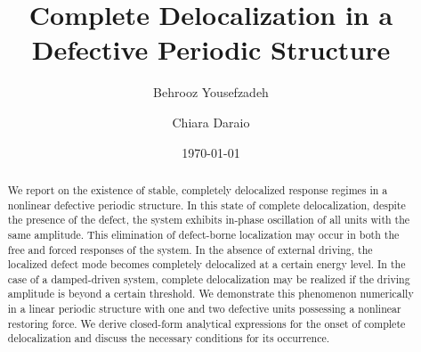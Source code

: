 \documentclass[aps,pre,twocolumn,groupedaddress]{revtex4-1}
\begin{document}

\title{Complete Delocalization in a Defective Periodic Structure}


\author{Behrooz Yousefzadeh}
\author{Chiara Daraio}


\date{\today}

\begin{abstract}

We report on the existence of stable, completely delocalized response regimes in a nonlinear defective periodic structure. In this state of complete delocalization, despite the presence of the defect, the system exhibits in-phase oscillation of all units with the same amplitude. This elimination of defect-borne localization may occur in both the free and forced responses of the system. In the absence of external driving, the localized defect mode becomes completely delocalized at a certain energy level. In the case of a damped-driven system, complete delocalization may be realized if the driving amplitude is beyond a certain threshold. We demonstrate this phenomenon numerically in a linear periodic structure with one and two defective units possessing a nonlinear restoring force. We derive closed-form analytical expressions for the onset of complete delocalization and discuss the necessary conditions for its occurrence. %



\end{abstract}
\end{document}
